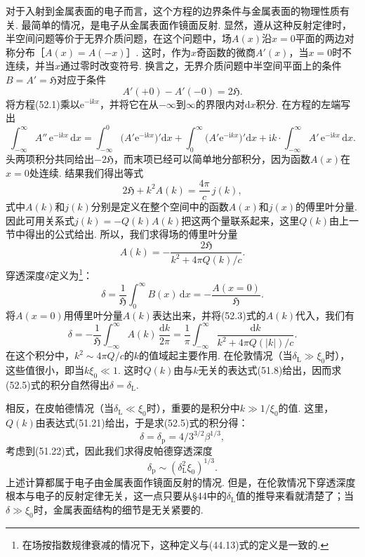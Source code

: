 对于入射到金属表面的电子而言，这个方程的边界条件与金属表面的物理性质有关. 最简单的情况，是电子从金属表面作镜面反射. 显然，遵从这种反射定律时，半空间问题等价于无界介质问题，在这个问题中，场$A(x)$沿$x=0$平面的两边对称分布［$A(x)=A(-x)$］. 这时，作为$x$奇函数的微商$A'(x)$，当$x=0$时不连续，并当$x$通过零时改变符号. 换言之，无界介质问题中半空间平面上的条件$B=A'=\mathfrak{H}$对应于条件
\begin{equation}
A'(+0)-A'(-0)=2\mathfrak{H}.
\end{equation}
将方程(52.1)乘以$\mathrm{e}^{-\mathrm{i}kx}$，并将它在从$-\infty$到$\infty$的界限内对$\mathrm{d}x$积分. 在方程的左端写出
\begin{equation*}
\int_{-\infty}^{\infty}A''\,\mathrm{e}^{-\mathrm{i}kx}\,\mathrm{d}x
=\int_{-\infty}^{0}\bigl(A'\mathrm{e}^{-\mathrm{i}kx}\bigr)'\mathrm{d}x
+\int_{0}^{\infty}\bigl(A'\mathrm{e}^{-\mathrm{i}kx}\bigr)'\mathrm{d}x
+\mathrm{i}k\cdot\int_{-\infty}^{\infty}A'\,\mathrm{e}^{-\mathrm{i}kx}\,\mathrm{d}x.
\end{equation*}
头两项积分共同给出$-2\mathfrak{H}$，而末项已经可以简单地分部积分，因为函数$A(x)$在$x=0$处连续. 结果我们得出等式
\begin{equation*}
2\mathfrak{H}+k^2A(k)=\frac{4\pi}{c}\,j(k),
\end{equation*}
式中$A(k)$和$j(k)$分别是定义在整个空间中的函数$A(x)$和$j(x)$的傅里叶分量. 因此可用关系式$j(k)=-Q(k)A(k)$把这两个量联系起来，这里$Q(k)$由上一节中得出的公式给出. 所以，我们求得场的傅里叶分量
\begin{equation}
A(k)=-\frac{2\mathfrak{H}}{k^2+4\pi Q(k)/c}.
\end{equation}
穿透深度$\delta$定义为\footnote{在场按指数规律衰减的情况下，这种定义与(44.13)式的定义是一致的.}：
\begin{equation}
\delta=\frac{1}{\mathfrak{H}}\int_0^{\infty}B(x)\,\mathrm{d}x
=-\frac{A(x=0)}{\mathfrak{H}}.
\end{equation}
将$A(x=0)$用傅里叶分量$A(k)$表达出来，并将(52.3)式的$A(k)$代入，我们有
\begin{equation}
\delta=-\frac{1}{\mathfrak{H}}\int_{-\infty}^{\infty}A(k)\,\frac{\mathrm{d}k}{2\pi}
=\frac{1}{\pi}\int_{-\infty}^{\infty}
\frac{\mathrm{d}k}{k^2+4\pi Q(|k|)/c}.
\end{equation}
在这个积分中，$k^2\sim4\pi Q/c$的$k$的值域起主要作用. 在伦敦情况（当$\delta_{\mathrm{L}}\gg\xi_0$时），这些值很小，即当$k\xi_0\ll1$. 这时$Q(k)$由与$k$无关的表达式(51.8)给出，因而求(52.5)式的积分自然得出$\delta=\delta_{\mathrm{L}}$.

相反，在皮帕德情况（当$\delta_{\mathrm{L}}\ll\xi_0$时），重要的是积分中$k\gg1/\xi_0$的值. 这里，$Q(k)$由表达式(51.21)给出，于是求(52.5)式的积分得：
\begin{equation}
\delta=\delta_{\mathrm{p}}=4/3^{3/2}\beta^{1/3},
\end{equation}
考虑到(51.22)式，因此我们求得皮帕德穿透深度
\begin{equation}
\delta_{\mathrm{p}}\sim(\delta_{\mathrm{L}}^2\xi_0)^{1/3}.
\end{equation}
上述计算都属于电子由金属表面作镜面反射的情况. 但是，在伦敦情况下穿透深度根本与电子的反射定律无关，这一点只要从§44中的$\delta_{\mathrm{L}}$值的推导来看就清楚了；当$\delta\gg\xi_0$时，金属表面结构的细节是无关紧要的.

